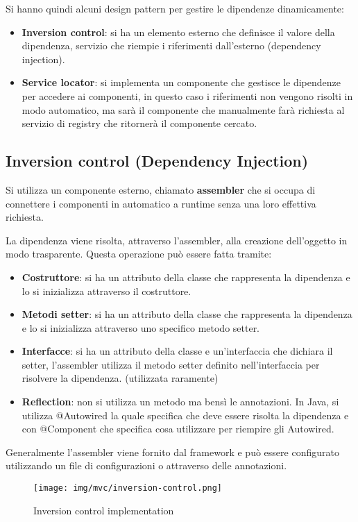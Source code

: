 Si hanno quindi alcuni design pattern per gestire le dipendenze dinamicamente:
\begin{itemize}
      \item \textbf{Inversion control}: si ha un elemento esterno che definisce
            il valore della dipendenza, servizio che riempie i riferimenti
            dall'esterno (dependency injection).
      \item \textbf{Service locator}: si implementa un componente che gestisce
            le dipendenze per accedere ai componenti, in questo caso i riferimenti
            non vengono risolti in modo automatico, ma sarà il componente che
            manualmente farà richiesta al servizio di registry che ritornerà il
            componente cercato.
\end{itemize}
\subsection{Inversion control (Dependency Injection)}
Si utilizza un componente esterno, chiamato \textbf{assembler} che si occupa di
connettere i componenti in automatico a runtime senza una loro effettiva richiesta.

La dipendenza viene risolta, attraverso l'assembler, alla creazione dell'oggetto
in modo trasparente. Questa operazione può essere fatta tramite:
\begin{itemize}
      \item \textbf{Costruttore}: si ha un attributo della classe che rappresenta
            la dipendenza e lo si inizializza attraverso il costruttore.
      \item \textbf{Metodi setter}: si ha un attributo della classe che rappresenta
            la dipendenza e lo si inizializza attraverso uno specifico metodo
            setter.
      \item \textbf{Interfacce}: si ha un attributo della classe e un'interfaccia
            che dichiara il setter, l'assembler utilizza il metodo setter definito
            nell'interfaccia per risolvere la dipendenza. (utilizzata raramente)
      \item \textbf{Reflection}: non si utilizza un metodo ma bensì le annotazioni.
            In Java, si utilizza @Autowired la quale specifica che deve essere
            risolta la dipendenza e con @Component che specifica cosa utilizzare
            per riempire gli Autowired.
\end{itemize}
Generalmente l'assembler viene fornito dal framework e può essere configurato
utilizzando un file di configurazioni o attraverso delle annotazioni.
\begin{figure}[!ht]
      \centering
      \texttt{[image: img/mvc/inversion-control.png]}
      \caption{Inversion control implementation}
\end{figure}
